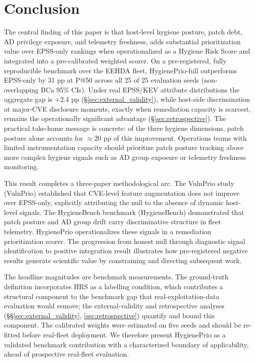 \section{Conclusion}

The central finding of this paper is that host-level hygiene posture, patch debt, AD privilege exposure, and telemetry freshness, adds substantial prioritization value over EPSS-only rankings when operationalized as a Hygiene Risk Score and integrated into a pre-calibrated weighted scorer. On a pre-registered, fully reproducible benchmark over the EEHDA fleet, HygienePrio-full outperforms EPSS-only by 31 pp at P@50 across all 25 of 25 evaluation seeds (non-overlapping BCa 95\% CIs). Under real EPSS/KEV attribute distributions the aggregate gap is +2.4 pp (\S\ref{sec:external_validity}), while host-side discrimination at major-CVE disclosure moments, exactly when remediation capacity is scarcest, remains the operationally significant advantage (\S\ref{sec:retrospective}). The practical take-home message is concrete: of the three hygiene dimensions, patch posture alone accounts for $\approx$20 pp of this improvement. Operations teams with limited instrumentation capacity should prioritize patch posture tracking above more complex hygiene signals such as AD group exposure or telemetry freshness monitoring.

This result completes a three-paper methodological arc. The VulnPrio study (VulnPrio) established that CVE-level feature augmentation does not improve over EPSS-only, explicitly attributing the null to the absence of dynamic host-level signals. The HygieneBench benchmark (HygieneBench) demonstrated that patch posture and AD group drift carry discriminative structure in fleet telemetry. HygienePrio operationalizes these signals in a remediation prioritization scorer. The progression from honest null through diagnostic signal identification to positive integration result illustrates how pre-registered negative results generate scientific value by constraining and directing subsequent work.

The headline magnitudes are benchmark measurements. The ground-truth definition incorporates HRS as a labelling condition, which contributes a structural component to the benchmark gap that real-exploitation-data evaluation would remove; the external-validity and retrospective analyses (\S\S\ref{sec:external_validity}, \ref{sec:retrospective}) quantify and bound this component. The calibrated weights were estimated on five seeds and should be re-fitted before real-fleet deployment. We therefore present HygienePrio as a validated benchmark contribution with a characterized boundary of applicability, ahead of prospective real-fleet evaluation.

